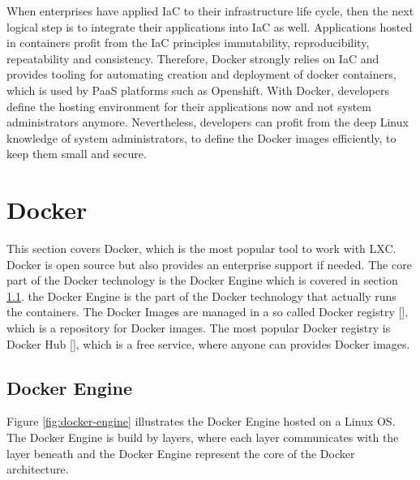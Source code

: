 When enterprises have applied IaC to their infrastructure life cycle, then the next logical step is to integrate their applications into IaC as well. Applications hosted in containers profit from the IaC principles immutability, reproducibility, repeatability and consistency. Therefore, Docker strongly relies on IaC and provides tooling for automating creation and deployment of docker containers, which is used by PaaS platforms such as Openshift. With Docker, developers define the hosting environment for their applications now and not system administrators anymore. Nevertheless, developers can profit from the deep Linux knowledge of system administrators, to define the Docker images efficiently, to keep them small and secure. 

\section{Docker}
\label{sec:docker}
This section covers Docker, which is the most popular tool to work with LXC. Docker is open source but also provides an enterprise support if needed. The core part of the Docker technology is the Docker Engine which is covered in section \ref{sec:docker-engine}. the Docker Engine is the part of the Docker technology that actually runs the containers. The Docker Images are managed in a so called Docker registry [\cite{DockerRegistry2018}], which is a repository for Docker images. The most popular Docker registry is Docker Hub [\cite{DockerRegistry2018}], which is a free service, where anyone can provides Docker images.

\subsection{Docker Engine}
\label{sec:docker-engine}
Figure \ref{fig:docker-engine} illustrates the Docker Engine hosted on a Linux OS. The Docker Engine is build by layers, where each layer communicates with the layer beneath and the Docker Engine represent the core of the Docker architecture. 


